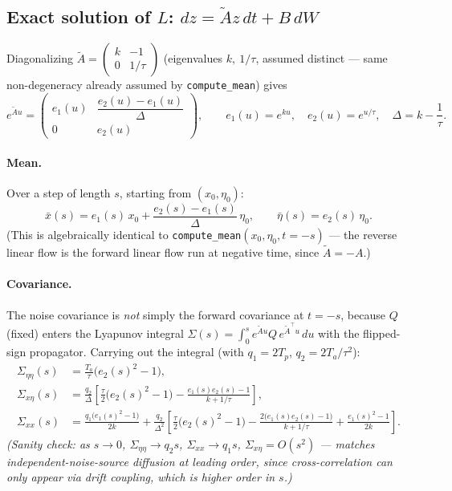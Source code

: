 \documentclass[11pt]{article}
\begin{document}
\subsection{Exact solution of $L$: $dz = \tilde A z\,dt + B\,dW$}

Diagonalizing $\tilde A = \begin{pmatrix} k & -1 \\ 0 & 1/\tau\end{pmatrix}$
(eigenvalues $k,\ 1/\tau$, assumed distinct — same non-degeneracy already
assumed by \texttt{compute\_mean}) gives
\begin{equation}
e^{\tilde A u} =
\begin{pmatrix}
e_1(u) & \dfrac{e_2(u)-e_1(u)}{\Delta} \\[6pt]
0 & e_2(u)
\end{pmatrix},
\qquad
e_1(u) = e^{ku},\quad e_2(u) = e^{u/\tau},\quad \Delta = k - \frac{1}{\tau}.
\end{equation}

\paragraph{Mean.} Over a step of length $s$, starting from $(x_0,\eta_0)$:
\begin{equation}
\bar x(s) = e_1(s)\,x_0 + \frac{e_2(s)-e_1(s)}{\Delta}\,\eta_0,
\qquad
\bar\eta(s) = e_2(s)\,\eta_0.
\label{eq:mean-exact}
\end{equation}
(This is algebraically identical to \texttt{compute\_mean}$(x_0,\eta_0,t{=}{-}s)$ —
the reverse linear flow is the forward linear flow run at negative time,
since $\tilde A = -A$.)

\paragraph{Covariance.} The noise covariance is \emph{not} simply the forward
covariance at $t=-s$, because $Q$ (fixed) enters the Lyapunov integral
$\Sigma(s)=\int_0^s e^{\tilde A u}Q\,e^{\tilde A^\top u}\,du$ with the flipped-sign
propagator. Carrying out the integral (with $q_1=2T_p$, $q_2=2T_a/\tau^2$):
\begin{align}
\Sigma_{\eta\eta}(s) &= \frac{T_a}{\tau}\big(e_2(s)^2-1\big),
\label{eq:cov-etaeta}\\[4pt]
\Sigma_{x\eta}(s) &= \frac{q_2}{\Delta}
\left[\frac{\tau}{2}\big(e_2(s)^2-1\big) - \frac{e_1(s)e_2(s)-1}{k+1/\tau}\right],
\label{eq:cov-xeta}\\[4pt]
\Sigma_{xx}(s) &= \frac{q_1\big(e_1(s)^2-1\big)}{2k}
+ \frac{q_2}{\Delta^2}
\left[\frac{\tau}{2}\big(e_2(s)^2-1\big) - \frac{2\big(e_1(s)e_2(s)-1\big)}{k+1/\tau} + \frac{e_1(s)^2-1}{2k}\right].
\label{eq:cov-xx}
\end{align}
\emph{(Sanity check: as $s\to0$, $\Sigma_{\eta\eta}\to q_2 s$, $\Sigma_{xx}\to q_1 s$,
$\Sigma_{x\eta}=O(s^2)$ — matches independent-noise-source diffusion at leading
order, since cross-correlation can only appear via drift coupling, which is
higher order in $s$.)}
\end{document}
